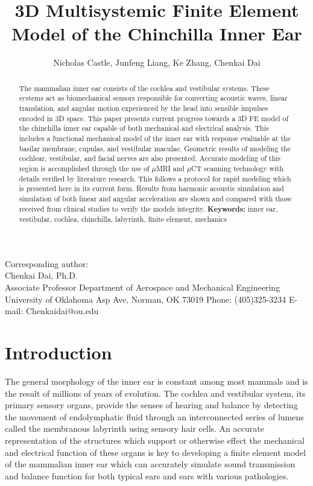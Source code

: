 \documentclass[12pt]{article}
\title{\textbf{\normalsize 3D Multisystemic Finite Element Model of the Chinchilla Inner Ear}}
\author{\normalsize Nicholas Castle, Junfeng Liang, Ke Zhang, Chenkai Dai}
\institute{\normalsize Aerospace and Mechanical Engineering, University of Oklahoma, Norman, OK 73019 \\ \normalsize United States of America}
\date{}
\begin{document}
\maketitle

\noindent Corresponding author: \\
Chenkai Dai, Ph.D. \\
Associate Professor \newline
Department of Aerospace and Mechanical Engineering \newline
University of Oklahoma  Asp Ave, \newline
Norman, OK 73019 \newline
Phone: (405)325-3234 \newline
E-mail: Chenkaidai@ou.edu \newline

\newpage

\begin{abstract}
The mammalian inner ear consists of the cochlea and vestibular systems. These systems act as biomechanical sensors responsible for converting acoustic waves, linear translation, and angular motion experienced by the head into sensible impulses encoded in 3D space. This paper presents current progress towards a 3D FE model of the chinchilla inner ear capable of both mechanical and electrical analysis. This includes a functional mechanical model of the inner ear with response evaluable at the basilar membrane, cupulas, and vestibular maculae. Geometric results of modeling the cochlear, vestibular, and facial nerves are also presented. Accurate modeling of this region is accomplished through the use of $\mu$MRI and $\mu$CT scanning technology with details verified by literature research. This follows a protocol for rapid modeling which is presented here in its current form. Results from harmonic acoustic simulation and simulation of both linear and angular acceleration are shown and compared with those received from clinical studies to verify the models integrity. \newline \newline \textbf{Keywords:} inner ear, vestibular, cochlea, chinchilla, labyrinth, finite element, mechanics \newpage
\end{abstract}


\section{Introduction}
The general morphology of the inner ear is constant among most mammals and is the result of millions of years of evolution. \cite{ekdale:chinchanat} The cochlea and vestibular system, its primary sensory organs, provide the senses of hearing and balance by detecting the movement of endolymphatic fluid through an interconnected series of lumens called the membranous labyrinth using sensory hair cells. An accurate representation of the structures which support or otherwise effect the mechanical and electrical function of these organs is key to developing a finite element model of the mammalian inner ear which can accurately simulate sound transmission and balance function for both typical ears and ears with various pathologies. 
\end{document}
